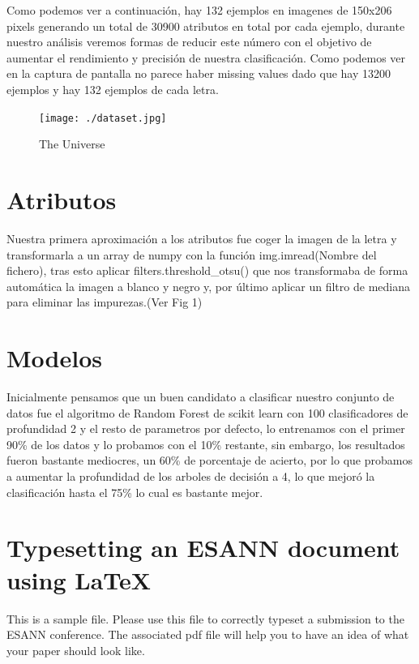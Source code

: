 \documentclass[8pt,a4paper]{article}
\begin{document}
\begin{flushleft}
Como podemos ver a continuaci\'on, hay 132 ejemplos en imagenes de 150x206 pixels generando un total de 30900 atributos en total por cada ejemplo, durante nuestro análisis veremos formas de reducir este n\'umero con el objetivo de aumentar el rendimiento y precisi\'on de nuestra clasificaci\'on. Como podemos ver en la captura de pantalla no parece haber missing values dado que hay 13200 ejemplos y hay 132 ejemplos de cada letra.
\end{flushleft}

\begin{figure}[htbp]
\centering
    \texttt{[image: ./dataset.jpg]}
\caption{The Universe}
\end{figure}


\section{Atributos}
Nuestra primera aproximaci\'on a los atributos fue coger la imagen de la letra y transformarla a un array de numpy con la funci\'on img.imread(Nombre del fichero), tras esto aplicar filters.threshold\_otsu() que nos transformaba de forma autom\'atica  la imagen a blanco y negro y, por \'ultimo aplicar un filtro de mediana para eliminar las impurezas.(Ver Fig 1)


\section{Modelos}
Inicialmente pensamos que un buen candidato a clasificar nuestro conjunto de datos fue el algoritmo de Random Forest de scikit learn con 100 clasificadores de profundidad 2 y el resto de parametros por defecto, lo entrenamos con el primer 90\% de los datos y lo probamos con el 10\% restante, sin embargo, los resultados fueron bastante mediocres, un 60\% de porcentaje de acierto, por lo que probamos a aumentar la profundidad de los arboles de decisi\'on a 4, lo que mejor\'o la clasificaci\'on hasta el 75\% lo cual es bastante mejor.

\section{Typesetting an ESANN document using \LaTeX}

This is a sample file. Please use this file to correctly typeset a
submission to the ESANN conference. The associated pdf file will
help you to have an idea of what your paper should look like.
\end{document}

